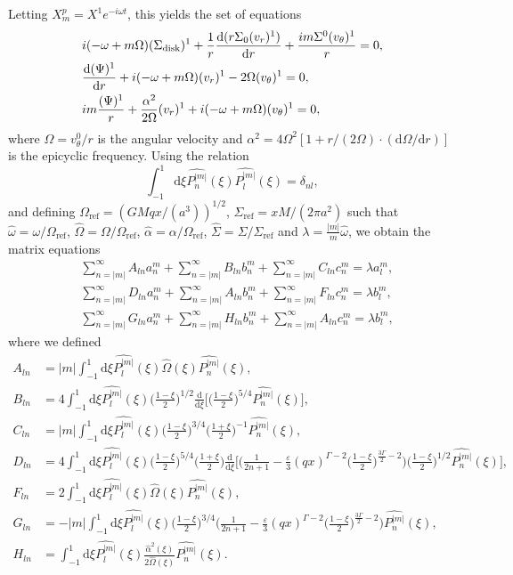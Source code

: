 \documentclass[11pt]{article}
\newcommand{\rd}{\mathrm{d}}
\newcommand{\vr}{v_{r}}
\newcommand{\vt}{v_{\theta}}
\newcommand{\Sigmad}{\Sigma_{\rm{disk}}}
\newcommand{\anm}{a_n^m}
\newcommand{\bnm}{b_n^m}
\newcommand{\cnm}{c_n^m}
\newcommand{\alm}{a_l^m}
\newcommand{\blm}{b_l^m}
\newcommand{\Pnm}{P_n^{|m|}}
\newcommand{\Plm}{P_l^{|m|}}
\newcommand{\hPnm}{\widehat{\Pnm}}
\newcommand{\hPlm}{\widehat{\Plm}}
\newcommand{\homega}{\widehat{\omega}}
\newcommand{\hOmega}{\widehat{\Omega}}
\newcommand{\Omegaref}{\Omega_{\mathrm{ref}}}
\newcommand{\halpha}{\widehat{\alpha}}
\newcommand{\Sigmaref}{\Sigma_{\mathrm{ref}}}
\newcommand{\hSigma}{\widehat{\Sigma}}
\begin{document}
Letting $X_m^p = X^1  e^{-i \omega t}$, this yields the set of equations
\begin{align}
&i(-\omega + m \Omega)(\Sigmad)^1 + \frac{1}{r} \frac{\rd (r\Sigma_0 (\vr)^1)}{\rd r} + \frac{im\Sigma^0 (\vt)^1}{r} = 0,\\
&\frac{\rd (\Psi)^1}{\rd r} + i(-\omega + m \Omega)(\vr)^1 - 2 \Omega (\vt)^1 = 0,\\
&i m \frac{(\Psi)^1}{r} + \frac{\alpha^2}{2\Omega} (\vr)^1 + i(-\omega + m \Omega)(\vt)^1 = 0,
\end{align}
where $\Omega = \vt^0/r$ is the angular velocity and $\alpha^2=4\Omega^2[1+r/(2\Omega)\cdot(\rd \Omega /\rd r)]$ is the epicyclic frequency. Using the relation 
$$\int_{-1}^{1} \rd \xi \hPnm(\xi)\hPlm(\xi) = \delta_{nl},$$
and defining $\Omegaref=(GMqx/(a^3 ))^{1/2}$, $\Sigmaref=xM/(2\pi a^2)$   such that $\homega = \omega/\Omegaref$, $\hOmega = \Omega/\Omegaref$, $\halpha = \alpha/\Omegaref$, $\hSigma=\Sigma/\Sigmaref$ and $\lambda=\frac{|m|}{m}\homega$, we obtain the matrix equations
\begin{align*}
&\sum_{n=|m|}^{\infty}  A_{ln} \anm  +\sum_{n=|m|}^{\infty}  B_{ln}\bnm+\sum_{n=|m|}^{\infty}  C_{ln}\cnm= \lambda \alm ,\\
&\sum_{n=|m|}^{\infty}D_{ln}\anm + \sum_{n=|m|}^{\infty}   A_{ln} \bnm+  \sum_{n=|m|}^{\infty} F_{ln} \cnm  = \lambda   \blm ,\\
&\sum_{n=|m|}^{\infty}G_{ln}\anm + \sum_{n=|m|}^{\infty}   H_{ln} \bnm+  \sum_{n=|m|}^{\infty} A_{ln} \cnm  = \lambda   \blm ,
 \end{align*}
where we defined
\begin{align*}
A_{ln} &= |m| \int_{-1}^{1} \rd \xi  \hPlm(\xi)\hOmega(\xi)\hPnm(\xi) , \\
B_{ln} &= 4 \int_{-1}^{1} \rd \xi  \hPlm(\xi) \bigg(\frac{1-\xi}{2}\bigg)^{1/2} \frac{\rd}{\rd \xi} \bigg[\bigg(\frac{1-\xi}{2}\bigg)^{5/4}\hPnm(\xi)\bigg], \\
C_{ln} &= |m| \int_{-1}^{1} \rd \xi \hPlm(\xi) \bigg(\frac{1-\xi}{2}\bigg)^{3/4}\bigg(\frac{1+\xi}{2}\bigg)^{-1}   \hPnm(\xi), \\
D_{ln} &= 4 \int_{-1}^{1} \rd \xi \hPlm(\xi)  \bigg(\frac{1-\xi}{2}\bigg)^{5/4} \bigg(\frac{1+\xi}{2}\bigg) 
\frac{\rd}{\rd \xi} \bigg[\bigg(\frac{1}{2n+1}-\frac{\varepsilon}{3}  (qx)^{\Gamma-2} \bigg(\frac{1-\xi}{2}\bigg)^{\frac{3\Gamma}{2}-2}\bigg) \bigg(\frac{1-\xi}{2}\bigg)^{1/2}\hPnm(\xi) \bigg] ,\\
F_{ln} &=2 \int_{-1}^{1} \rd \xi  \hPlm(\xi)\hOmega(\xi)\hPnm(\xi) , \\
G_{ln} &= -|m| \int_{-1}^{1} \rd \xi \hPlm(\xi)  \bigg(\frac{1-\xi}{2}\bigg)^{3/4} 
\bigg(\frac{1}{2n+1}-\frac{\varepsilon}{3}  (qx)^{\Gamma-2} \bigg(\frac{1-\xi}{2}\bigg)^{\frac{3\Gamma}{2}-2}\bigg) \hPnm(\xi)  ,\\
H_{ln} &=  \int_{-1}^{1} \rd \xi  \hPlm(\xi)\frac{\halpha^2(\xi)}{2\hOmega(\xi)}\hPnm(\xi) .
\end{align*}
\end{document}
